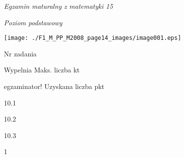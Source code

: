 \documentclass[a4paper,12pt]{article}
\begin{document}
{\it Egzamin maturalny z matematyki 15}

{\it Poziom podstawowy}
\begin{center}
\texttt{[image: ./F1\_M\_PP\_M2008\_page14\_images/image001.eps]}
\end{center}
Nr zadania

Wypelnia Maks. liczba kt

egzaminator! Uzyskana liczba pkt

10.1

10.2

10.3

1
\end{document}
